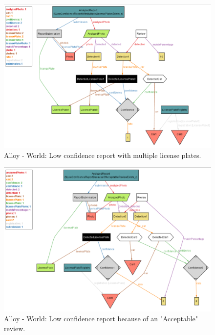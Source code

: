 \begin{figure}[H]
    \centering
    \includegraphics[width=\textwidth]{Images/alloy/11.png}
    \caption{\label{fig:alloy}Alloy - World: Low confidence report with multiple license plates.}
\end{figure}

\begin{figure}[H]
    \centering
    \includegraphics[width=\textwidth]{Images/alloy/12.png}
    \caption{\label{fig:alloy}Alloy - World: Low confidence report because of an "Acceptable" review.}
\end{figure}

